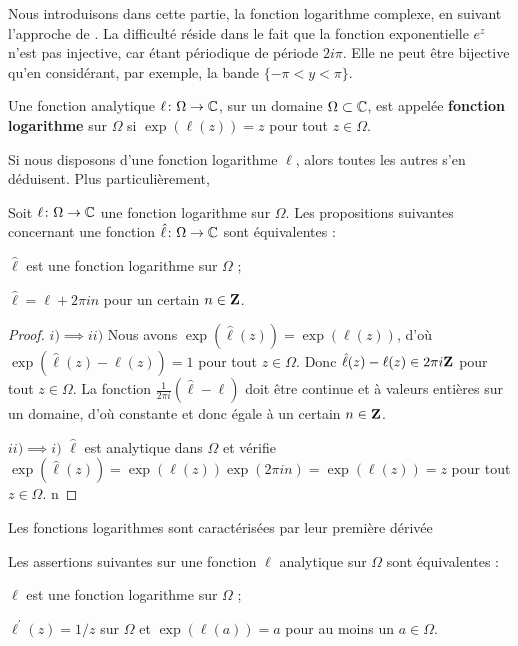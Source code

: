 Nous introduisons dans cette partie, la fonction logarithme complexe, en suivant l'approche de \cite{remmert1991theory}. La difficulté réside dans le fait que la fonction exponentielle $e^z$ n'est pas injective, car étant périodique de période $2 i \pi$. Elle ne peut être bijective qu'en considérant, par exemple, la bande $\{ -\pi < y <\pi\}$. 

\begin{fdefn}
Une fonction analytique $\ell \colon  \Omega \to \mathbb{C}$, sur un domaine $\Omega \subset \mathbb{C}$, est appelée \textbf{fonction logarithme} sur $\Omega$ si $\exp(\ell( z)) = z$ pour tout $z \in \Omega$. 
\end{fdefn}
Si nous disposons d'une fonction logarithme $\ell$, alors toutes les autres s'en déduisent. Plus particulièrement,
\begin{prop}
Soit $\ell \colon \Omega \to \mathbb{C}$ une fonction logarithme sur $\Omega$. Les propositions suivantes concernant une fonction $\hat{\ell} \colon \Omega \to \mathbb{C}$ sont équivalentes :
\begin{MYenumerate}
\item $\hat{\ell}$ est une fonction logarithme sur $\Omega$ ;
\item $\hat{\ell} = \ell + 2 \pi i n$ pour un certain $n \in {\mathbf Z}$.
\end{MYenumerate}
\end{prop}

\begin{proof}
$i)\implies ii)$ Nous avons $\exp(\hat{\ell}(z))=\exp(\ell (z))$, d'où $\exp (\hat{\ell}(z)-\ell(z))=1$ pour tout $z \in \Omega$. Donc $\hat{\ell}(z)-\ell(z) \in 2 \pi i {\mathbf Z}$ pour tout $z \in \Omega$. La fonction $\frac{1}{2 \pi i}(\hat{\ell} -\ell)$ doit être continue et à valeurs entières sur un domaine, d'où constante et donc égale à un certain $n \in {\mathbf Z}$.

$ii) \implies i)$ $\hat{\ell}$ est analytique dans $\Omega$ et vérifie $\exp(\hat{\ell}(z))=\exp(\ell(z)) \exp(2 \pi i n)=\exp (\ell(z))=z$
pour tout $z \in \Omega$. n 
\end{proof}
Les fonctions logarithmes sont caractérisées par leur première dérivée

\begin{prop}
Les assertions suivantes sur une fonction $\ell$ analytique sur $\Omega$ sont équivalentes :
\begin{MYenumerate}
\item $\ell$ est une fonction logarithme sur $\Omega$ ;
\item $\ell^\prime(z)=1/z$ sur $\Omega$ et $\exp(\ell(a))=a$ pour au moins un $a \in \Omega$.
\end{MYenumerate}
\end{prop}

